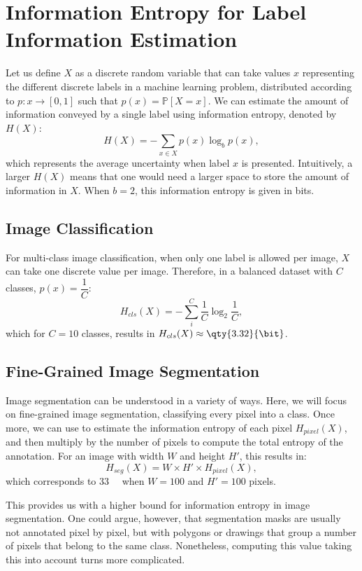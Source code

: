\section{Information Entropy for Label Information Estimation}
\label{app:bits}

Let us define $X$ as a discrete random variable that can take values $x$ representing the different discrete labels in a machine learning problem, distributed according to $p: x\rightarrow [0, 1]$ such that $p(x)=\mathbb{P}[X=x]$. We can estimate the amount of information conveyed by a single label using information entropy, denoted by $H(X)$:
\begin{equation}
    H(X)=-\sum_{x\in X} p(x)\log_b p(x),
    \label{eq:entropy}
\end{equation}
which represents the average uncertainty when label $x$ is presented. Intuitively, a larger $H(X)$ means that one would need a larger space to store the amount of information in $X$. When $b=2$, this information entropy is given in bits.

\subsection{Image Classification}
For multi-class image classification, when only one label is allowed per image, $X$ can take one discrete value per image. Therefore, in a balanced dataset with $C$ classes, $p(x)=\dfrac{1}{C}$:
\[
H_{cls}(X) = - \sum_i^C \dfrac{1}{C}\log_2\dfrac{1}{C},
\]
which for $C=10$ classes, results in $H_{cls}(X)\approx \qty{3.32}{\bit}$.

\subsection{Fine-Grained Image Segmentation}
Image segmentation can be understood in a variety of ways. Here, we will focus on fine-grained image segmentation, \ie classifying every pixel into a class. Once more, we can use  to estimate the information entropy of each pixel $H_{pixel}(X)$, and then multiply by the number of pixels to compute the total entropy of the annotation. For an image with width $W$ and height $H'$, this results in:
\begin{equation}
    H_{seg}(X) = W\times H' \times H_{pixel}(X),
    \label{eq:seg_entropy}
\end{equation}
which corresponds to \qty{33}{\kilo\bit} when $W=100$ and $H'=100$ pixels.

This provides us with a higher bound for information entropy in image segmentation. One could argue, however, that segmentation masks are usually not annotated pixel by pixel, but with polygons or drawings that group a number of pixels that belong to the same class. Nonetheless, computing this value taking this into account turns more complicated.

